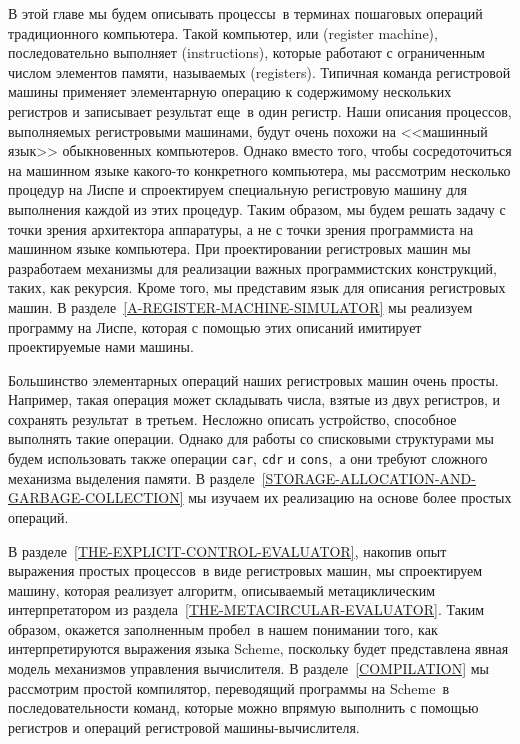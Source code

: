 В этой главе мы будем описывать процессы~в терминах пошаговых
операций традиционного компьютера. Такой компьютер, или 
 (register machine),
последовательно выполняет  (instructions),
которые работают с ограниченным числом элементов памяти, называемых
 (registers).  Типичная команда регистровой
машины применяет элементарную операцию к содержимому нескольких
регистров и записывает результат еще~в один регистр.  Наши описания
процессов, выполняемых регистровыми машинами, будут очень похожи на
<<машинный язык>> обыкновенных компьютеров. Однако вместо того, чтобы
сосредоточиться на машинном языке какого-то конкретного компьютера, мы
рассмотрим несколько процедур на Лиспе и спроектируем специальную
регистровую машину для выполнения каждой из этих процедур.  Таким
образом, мы будем решать задачу с точки зрения архитектора аппаратуры,
а не с точки зрения программиста на машинном языке компьютера.  При
проектировании регистровых машин мы разработаем механизмы для
реализации важных программистских конструкций, таких, как рекурсия.
Кроме того, мы представим язык для описания регистровых машин.  В
разделе~\ref{A-REGISTER-MACHINE-SIMULATOR} мы реализуем
программу на Лиспе, которая с помощью этих описаний имитирует
проектируемые нами машины.

Большинство элементарных операций наших регистровых машин очень
просты.  Например, такая операция может складывать числа, взятые из
двух регистров, и сохранять результат~в третьем.  Несложно описать
устройство, способное выполнять такие операции.  Однако для работы со
списковыми структурами мы будем использовать также операции
{\tt car}, {\tt cdr} и {\tt cons},~а они требуют
сложного механизма выделения памяти.  В 
разделе~\ref{STORAGE-ALLOCATION-AND-GARBAGE-COLLECTION} мы изучаем
их реализацию на основе более простых операций.

В разделе~\ref{THE-EXPLICIT-CONTROL-EVALUATOR},
накопив опыт выражения простых процессов~в виде регистровых машин, мы
спроектируем машину, которая реализует алгоритм, описываемый
метациклическим интерпретатором из 
раздела~\ref{THE-METACIRCULAR-EVALUATOR}.  Таким образом, окажется
заполненным пробел~в нашем понимании того, как интерпретируются
выражения языка Scheme, поскольку будет представлена явная модель
механизмов управления вычислителя. В 
разделе~\ref{COMPILATION} мы рассмотрим простой компилятор,
переводящий программы на Scheme~в последовательности команд,
которые можно впрямую выполнить с помощью регистров и операций
регистровой машины-вычислителя.
